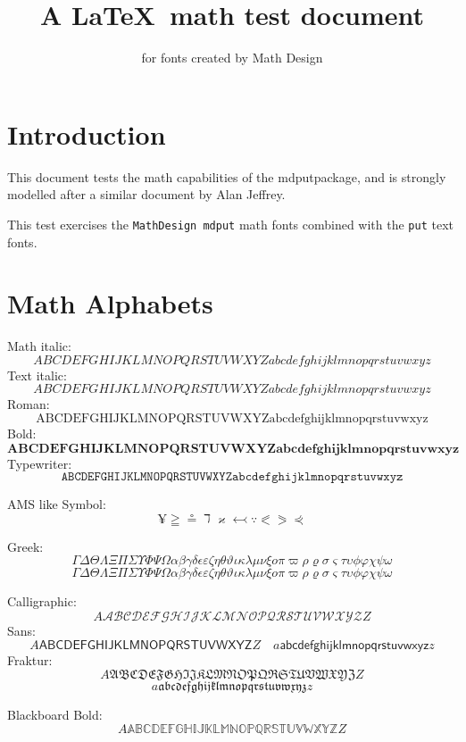 \documentclass[fleqn]{article}
\title{A \LaTeX\ math test document}
\author{for fonts created by Math Design}
\let\omicron=o
\begin{document}
\maketitle

\section*{Introduction}

This document tests the math capabilities of the mdputpackage, and is
strongly modelled after a similar document by Alan Jeffrey.

This test exercises the {\tt MathDesign mdput} math fonts combined with the
{\tt put} text fonts.

\section*{Math Alphabets}

Math italic:
$$
   ABCDEFGHIJKLMNOPQRSTUVWXYZ
   abcdefghijklmnopqrstuvwxyz
$$
Text italic:
$$
   \mathit{ABCDEFGHIJKLMNOPQRSTUVWXYZ
      abcdefghijklmnopqrstuvwxyz}
$$
Roman:
$$
   \mathrm{ABCDEFGHIJKLMNOPQRSTUVWXYZ
      abcdefghijklmnopqrstuvwxyz}
$$
Bold:
$$
   \mathbf{ABCDEFGHIJKLMNOPQRSTUVWXYZ
      abcdefghijklmnopqrstuvwxyz}
$$
Typewriter:
$$
   \mathtt{ABCDEFGHIJKLMNOPQRSTUVWXYZ
      abcdefghijklmnopqrstuvwxyz}
$$

AMS like Symbol:
$$
   \yen \geqq \circeq \daleth \varkappa \leftarrowtail \because
   \eqslantless  \eqslantgtr \curlyeqprec
$$

Greek:
$$
   \Gamma\Delta\Theta\Lambda\Xi\Pi\Sigma\Upsilon\Phi\Psi\Omega
  \alpha\beta\gamma\delta\epsilon\varepsilon\zeta\eta\theta\vartheta
   \iota\kappa\lambda\mu\nu\xi\omicron\pi\varpi\rho\varrho
   \sigma\varsigma\tau\upsilon\phi\varphi\chi\psi\omega
$$
{
$$
       \Gamma\Delta\Theta\Lambda\Xi\Pi\Sigma\Upsilon\Phi\Psi\Omega
  \alpha\beta\gamma\delta\epsilon\varepsilon\zeta\eta\theta\vartheta
   \iota\kappa\lambda\mu\nu\xi\omicron\pi\varpi\rho\varrho
   \sigma\varsigma\tau\upsilon\phi\varphi\chi\psi\omega
$$}

Calligraphic:
$$A\mathcal{ABCDEFGHIJKLMNOPQRSTUVWXYZ}Z$$
Sans:
$$
   A\mathsf{ABCDEFGHIJKLMNOPQRSTUVWXYZ}Z \quad
      a\mathsf{abcdefghijklmnopqrstuvwxyz}z
$$
Fraktur:
$$
   A\mathfrak{ABCDEFGHIJKLMNOPQRSTUVWXYZ}Z 
$$
$$
   a\mathfrak{abcdefghijklmnopqrstuvwxyz}z
$$

Blackboard Bold:
$$
   A\mathbb{ABCDEFGHIJKLMNOPQRSTUVWXYZ}Z
$$
\end{document}
